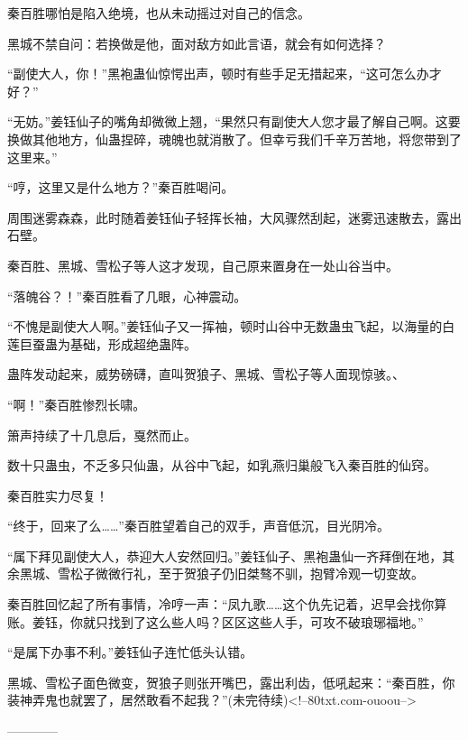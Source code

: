 \begin{this_body}
秦百胜哪怕是陷入绝境，也从未动摇过对自己的信念。

黑城不禁自问：若换做是他，面对敌方如此言语，就会有如何选择？

“副使大人，你！”黑袍蛊仙惊愕出声，顿时有些手足无措起来，“这可怎么办才好？”

“无妨。”姜钰仙子的嘴角却微微上翘，“果然只有副使大人您才最了解自己啊。这要换做其他地方，仙蛊捏碎，魂魄也就消散了。但幸亏我们千辛万苦地，将您带到了这里来。”

“哼，这里又是什么地方？”秦百胜喝问。

周围迷雾森森，此时随着姜钰仙子轻挥长袖，大风骤然刮起，迷雾迅速散去，露出石壁。

秦百胜、黑城、雪松子等人这才发现，自己原来置身在一处山谷当中。

“落魄谷？！”秦百胜看了几眼，心神震动。

“不愧是副使大人啊。”姜钰仙子又一挥袖，顿时山谷中无数蛊虫飞起，以海量的白莲巨蚕蛊为基础，形成超绝蛊阵。

蛊阵发动起来，威势磅礴，直叫贺狼子、黑城、雪松子等人面现惊骇。、

“啊！”秦百胜惨烈长啸。

箫声持续了十几息后，戛然而止。

数十只蛊虫，不乏多只仙蛊，从谷中飞起，如乳燕归巢般飞入秦百胜的仙窍。

秦百胜实力尽复！

“终于，回来了么……”秦百胜望着自己的双手，声音低沉，目光阴冷。

“属下拜见副使大人，恭迎大人安然回归。”姜钰仙子、黑袍蛊仙一齐拜倒在地，其余黑城、雪松子微微行礼，至于贺狼子仍旧桀骜不驯，抱臂冷观一切变故。

秦百胜回忆起了所有事情，冷哼一声：“凤九歌……这个仇先记着，迟早会找你算账。姜钰，你就只找到了这么些人吗？区区这些人手，可攻不破琅琊福地。”

“是属下办事不利。”姜钰仙子连忙低头认错。

黑城、雪松子面色微变，贺狼子则张开嘴巴，露出利齿，低吼起来：“秦百胜，你装神弄鬼也就罢了，居然敢看不起我？”(未完待续)<!--80txt.com-ouoou-->

------------

\end{this_body}

